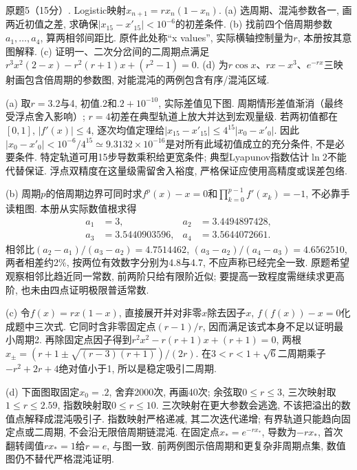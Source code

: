 \begin{exercise}
原题5（15分）. Logistic映射$x_{n+1}=rx_n(1-x_n)$. (a) 选周期、混沌参数各一, 画两近初值之差, 求确保$|x_{15}-x'_{15}|<10^{-6}$的初差条件. (b) 找前四个倍周期参数$a_1,\ldots,a_4$, 算两相邻间距比. 原件此处称“x values”, 实际横轴控制量为$r$, 本册按其意图解释. (c) 证明一、二次分岔间的二周期点满足$r^3x^2(2-x)-r^2(r+1)x+(r^2-1)=0$. (d) 为$r\cos x$、$rx-x^3$、$e^{-rx}$三映射画包含倍周期的参数图, 对能混沌的两例包含有序/混沌区域.
\end{exercise}
\begin{solution}
(a) 取$r=3.2$与4, 初值$.2$和$.2+10^{-10}$, 实际差值见下图. 周期情形差值渐消（最终受浮点舍入影响）; $r=4$初差在典型轨道上放大并达到宏观量级. 若两初值都在$[0,1]$, $|f'(x)|\le4$, 逐次均值定理给$|x_{15}-x'_{15}|\le4^{15}|x_0-x'_0|$. 因此$|x_0-x'_0|<10^{-6}/4^{15}\simeq9.3132\times10^{-16}$是对所有此域初值成立的充分条件, 不是必要条件. 特定轨道可用15步导数乘积给更宽条件; 典型Lyapunov指数估计$\ln2$不能代替保证. 浮点双精度在这量级需留舍入裕度, 严格保证应使用高精度或误差包络.

(b) 周期$p$的倍周期边界可同时求$f^p(x)-x=0$和$\prod_{k=0}^{p-1}f'(x_k)=-1$, 不必靠手读粗图. 本册从实际数值根求得
\[
\begin{aligned}
a_1&=3, & a_2&=3.4494897428,\\
a_3&=3.5440903596, &a_4&=3.5644072661.
\end{aligned}
\]
相邻比$(a_2-a_1)/(a_3-a_2)=4.7514462$, $(a_3-a_2)/(a_4-a_3)=4.6562510$, 两者相差约2\%, 按两位有效数字分别为4.8与4.7, 不应声称已经完全一致. 原题希望观察相邻比趋近同一常数, 前两阶只给有限阶近似; 要提高一致程度需继续求更高阶, 也未由四点证明极限普适常数.

(c) 令$f(x)=rx(1-x)$, 直接展开并对非零$x$除去因子$x$, $f(f(x))-x=0$化成题中三次式. 它同时含非零固定点$(r-1)/r$, 因而满足该式本身不足以证明最小周期2. 再除固定点因子得到$r^2x^2-r(r+1)x+(r+1)=0$, 两根$x_\pm=(r+1\pm\sqrt{(r-3)(r+1)})/(2r)$. 在$3<r<1+\sqrt6$二周期乘子$-r^2+2r+4$绝对值小于1, 所以是稳定吸引二周期.

(d) 下面图取固定$x_0=.2$, 舍弃2000次, 再画40次; 余弦取$0\le r\le3$, 三次映射取$1\le r\le2.59$, 指数映射取$0\le r\le10$. 三次映射在更大参数会逃逸, 不该把溢出的数值点解释成混沌吸引子. 指数映射严格递减, 其二次迭代递增; 有界轨道只能趋向固定点或二周期, 不会沿无限倍周期链混沌. 在固定点$x_*=e^{-rx_*}$, 导数为$-rx_*$, 首次翻转阈值$rx_*=1$给$r=e$, 与图一致. 前两例图示倍周期和更复杂非周期点集, 数值图仍不替代严格混沌证明.
\end{solution}

